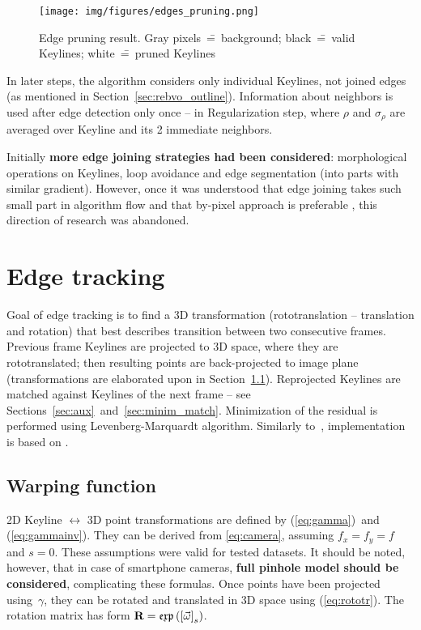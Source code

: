 \begin{figure}[ht]
	\centering\texttt{[image: img/figures/edges\_pruning.png]}
	\caption{ Edge pruning result. Gray pixels~\==~background; black~\==~valid Keylines; white~\==~pruned Keylines }
	\label{fig:pruning}
\end{figure}

In later steps, the algorithm considers only individual Keylines, not joined edges (as mentioned in Section~\ref{sec:rebvo_outline}). Information about neighbors is used after edge detection only once -- in Regularization step, where $\rho$ and $\sigma_{\rho}$
are averaged over Keyline and its 2 immediate neighbors.

Initially \textbf{more edge joining strategies had been considered}: morphological operations on Keylines, loop avoidance and edge segmentation (into parts with similar gradient). However, once it was understood that edge joining takes such small part in algorithm flow and that by-pixel approach is preferable \cite{harris}, this direction of research was abandoned.



\section{Edge tracking}

Goal of edge tracking is to find a 3D transformation (rototranslation -- translation and rotation) that best describes transition between two consecutive frames. Previous frame Keylines are projected to 3D space, where they are rototranslated; then resulting points are back-projected to image plane (transformations are elaborated upon in Section~\ref{sec:warp}). Reprojected Keylines are matched against Keylines of the next frame -- see Sections~\ref{sec:aux}~and~\ref{sec:minim_match}. Minimization of the residual is performed using Levenberg-Marquardt algorithm. Similarly to~\cite{jose2015realtime}, implementation is based on \cite{madsen2004methods}.

\subsection{Warping function}
\label{sec:warp}

2D Keyline $\longleftrightarrow$ 3D point transformations are defined by (\ref{eq:gamma})~and (\ref{eq:gammainv}). They can be derived from \ref{eq:camera}, assuming $f_x = f_y = f$ and $s = 0$. These assumptions were valid for tested datasets. It should be noted, however, that in case of smartphone cameras, \textbf{full pinhole model should be considered}, complicating these formulas. Once points have been projected using~$\gamma$, they can be rotated and translated in 3D space using (\ref{eq:rototr}). The rotation matrix has form $\textbf{R} = \mathfrak{exp} \left ( \left[ \vec{\omega} \right ]_{s} \right )$.


